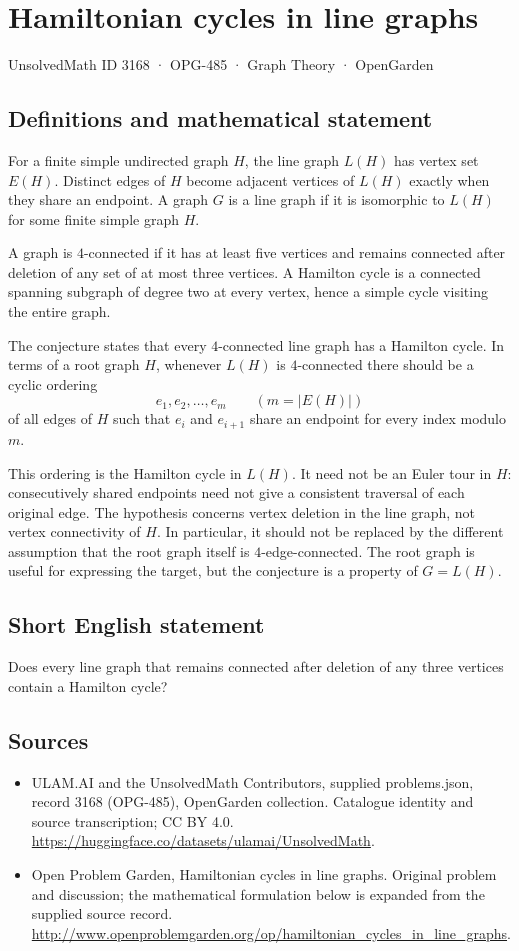 \documentclass[11pt,a4paper]{article}
\begin{document}
\section*{Hamiltonian cycles in line graphs}\label{3168}
{\small UnsolvedMath ID 3168 · OPG-485 · Graph Theory · OpenGarden}
\subsection{Definitions and mathematical statement}
For a finite simple undirected graph $H$, the line graph
$L(H)$ has vertex set $E(H)$. Distinct edges of $H$ become
adjacent vertices of $L(H)$ exactly when they share an
endpoint. A graph $G$ is a line graph if it is isomorphic
to $L(H)$ for some finite simple graph $H$.

A graph is $4$-connected if it has at least five vertices
and remains connected after deletion of any set of at most
three vertices. A Hamilton cycle is a connected spanning
subgraph of degree two at every vertex, hence a simple
cycle visiting the entire graph.

The conjecture states that every $4$-connected line graph
has a Hamilton cycle. In terms of a root graph $H$, whenever
$L(H)$ is $4$-connected there should be a cyclic ordering
\[
 e_1,e_2,\ldots,e_m\qquad(m=|E(H)|)
\]
of all edges of $H$ such that $e_i$ and $e_{i+1}$ share
an endpoint for every index modulo $m$.

This ordering is the Hamilton cycle in $L(H)$. It need
not be an Euler tour in $H$: consecutively shared endpoints
need not give a consistent traversal of each original edge.
The hypothesis concerns vertex deletion in the line graph,
not vertex connectivity of $H$. In particular, it should
not be replaced by the different assumption that the root
graph itself is $4$-edge-connected. The root graph is useful
for expressing the target, but the conjecture is a property
of $G=L(H)$.
\subsection{Short English statement}
Does every line graph that remains connected after deletion of any three vertices contain a Hamilton cycle?
\subsection{Sources}
\begin{itemize}
\item[S1] ULAM.AI and the UnsolvedMath Contributors, supplied problems.json, record 3168 (OPG-485), OpenGarden collection. Catalogue identity and source transcription; CC BY 4.0.
\url{https://huggingface.co/datasets/ulamai/UnsolvedMath}.
\item[S2] Open Problem Garden, Hamiltonian cycles in line graphs. Original problem and discussion; the mathematical formulation below is expanded from the supplied source record.
\url{http://www.openproblemgarden.org/op/hamiltonian_cycles_in_line_graphs}.
\end{itemize}
\end{document}
